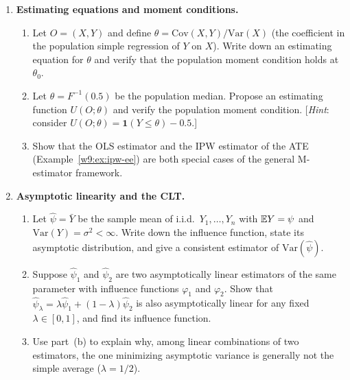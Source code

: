 \documentclass[master.tex]{subfiles}
\begin{document}
\begin{enumerate}

\item \textbf{Estimating equations and moment conditions.}
  \begin{enumerate}
    \item Let $O = (X, Y)$ and define $\theta = \mathrm{Cov}(X,Y) /
      \mathrm{Var}(X)$ (the coefficient in the population simple
      regression of $Y$ on $X$).  Write down an estimating equation
      for $\theta$ and verify that the population moment condition
      holds at $\theta_0$.
    \item Let $\theta = F^{-1}(0.5)$ be the population median.
      Propose an estimating function $U(O;\theta)$ and verify the
      population moment condition.  [\emph{Hint}: consider
      $U(O;\theta) = \mathbf{1}(Y \leq \theta) - 0.5$.]
    \item Show that the OLS estimator and the IPW estimator of the
      ATE (Example~\ref{w9:ex:ipw-ee}) are both special cases of the
      general M-estimator framework.
  \end{enumerate}

\item \textbf{Asymptotic linearity and the CLT.}
  \begin{enumerate}
    \item Let $\hat\psi = \bar Y$ be the sample mean of i.i.d.\
      $Y_1,\dots,Y_n$ with $\mathbb{E} Y = \psi$ and $\mathrm{Var}(Y) =
      \sigma^2 < \infty$.  Write down the influence function, state
      its asymptotic distribution, and give a consistent estimator of
      $\mathrm{Var}(\hat\psi)$.
    \item Suppose $\hat\psi_1$ and $\hat\psi_2$ are two asymptotically
      linear estimators of the same parameter with influence functions
      $\varphi_1$ and $\varphi_2$.  Show that
      $\hat\psi_\lambda = \lambda\hat\psi_1 + (1-\lambda)\hat\psi_2$
      is also asymptotically linear for any fixed $\lambda \in [0,1]$,
      and find its influence function.
    \item Use part~(b) to explain why, among linear combinations of
      two estimators, the one minimizing asymptotic variance is
      generally not the simple average ($\lambda = 1/2$).
  \end{enumerate}


\end{enumerate}
\end{document}
